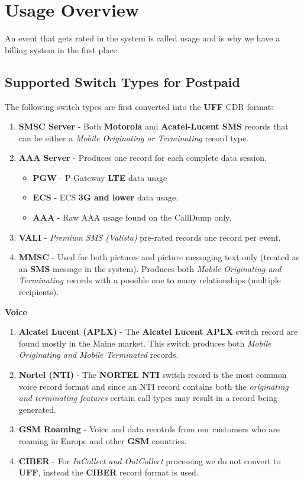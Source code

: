\documentclass[12pt,twoside]{article}
\begin{document}
\section{Usage Overview}
\label{sec-2}

  An event that gets rated in the system is called usage and is why we have a billing system in the first place.  
\subsection{Supported Switch Types for Postpaid}
\label{sec-2-1}

    The following switch types are first converted into the \textbf{UFF} CDR format:\\
\begin{enumerate}
\item \textbf{SMSC Server} - Both \textbf{Motorola} and \textbf{Acatel-Lucent SMS} records that can be either a \emph{Mobile Originating or Terminating} record type.
\item \textbf{AAA Server} - Produces one record for each complete data session.
\begin{itemize}
\item \textbf{PGW} - P-Gateway \textbf{LTE} data usage
\item \textbf{ECS} - ECS \textbf{3G and lower} data usage.
\item \textbf{AAA} - Raw AAA usage found on the CallDump only.
\end{itemize}
\item \textbf{VALI} - \emph{Premium SMS (Valista)} pre-rated records one record per event.
\item \textbf{MMSC} - Used for both pictures and picture messaging text only (treated as an \textbf{SMS} message in the system). Produces both \emph{Mobile Originating and Terminating} records with a possible one to many relationships (multiple recipients). \\
\end{enumerate}
    \textbf{Voice}
\begin{enumerate}
\item \textbf{Alcatel Lucent (APLX)} - The \textbf{Alcatel Lucent APLX} switch record are found mostly in the Maine market. This switch produces both \emph{Mobile Originating and Mobile Terminated} records.
\item \textbf{Nortel (NTI)} - The \textbf{NORTEL NTI} switch record is the most common voice record format and since an NTI record contains both the \emph{originating and terminating features} certain call types may result in a record being generated.
\item \textbf{GSM Roaming} - Voice and data recotrds from our customers who are roaming in Europe and other \textbf{GSM} countries.
\item \textbf{CIBER} - For \emph{InCollect and OutCollect} processing we do not convert to \textbf{UFF}, instead the \textbf{CIBER} record format is used.
\end{enumerate}
\end{document}
